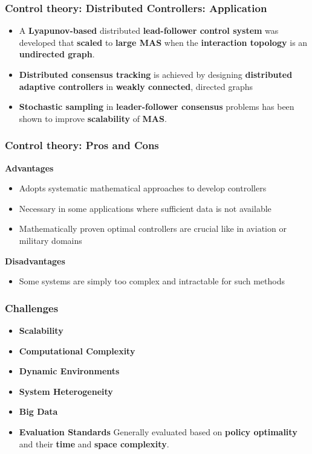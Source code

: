 \documentclass{beamer}
\begin{document}
	\begin{frame}
		\frametitle{Control theory: Distributed Controllers: Application}
		\begin{itemize}
			\item A \textbf{Lyapunov-based} distributed \textbf{lead-follower control system} was developed that \textbf{scaled} to \textbf{large MAS} when the \textbf{interaction topology} is an \textbf{undirected graph}.
			
			\item \textbf{Distributed consensus tracking} is achieved by designing \textbf{distributed adaptive controllers} in \textbf{weakly connected}, directed graphs
			
			\item  \textbf{Stochastic sampling} in \textbf{leader-follower consensus} problems has been shown to improve \textbf{scalability} of \textbf{MAS}.
		\end{itemize}
	\end{frame}

	\begin{frame}
		\frametitle{Control theory: Pros and Cons}
		\textbf{Advantages}
		\begin{itemize}
			\item Adopts systematic mathematical approaches to develop controllers
			\item Necessary in some applications where sufficient data is not available
			\item  Mathematically proven optimal controllers are
			crucial like in aviation or military domains
		\end{itemize}
		\textbf{Disadvantages}
		\begin{itemize}
			\item Some systems are simply too complex and intractable for such methods 
		\end{itemize}
	\end{frame}

	\begin{frame}
		\frametitle{Challenges}
		\begin{itemize}
			\item \textbf{Scalability}
			
			\item \textbf{Computational Complexity}
			
			\item \textbf{Dynamic Environments}
			
			\item \textbf{System Heterogeneity}
			
			\item \textbf{Big Data}
			
			\item \textbf{Evaluation Standards}  Generally evaluated based on \textbf{policy optimality} and their \textbf{time} and \textbf{space complexity}.
		\end{itemize}
	\end{frame}
	
\end{document}

